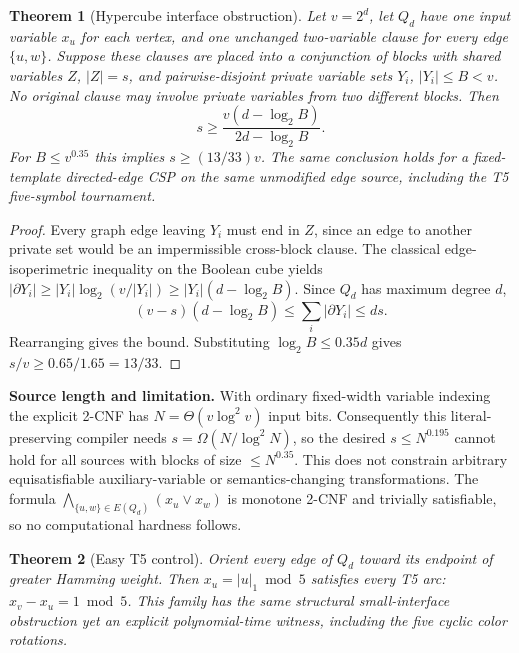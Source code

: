 \documentclass[11pt]{article}
\newtheorem{theorem}{Theorem}
\begin{document}
\begin{theorem}[Hypercube interface obstruction]
Let $v=2^d$, let $Q_d$ have one input variable $x_u$ for each vertex,
and one unchanged two-variable clause for every edge $\{u,w\}$.
Suppose these clauses are placed into a conjunction of blocks with
shared variables $Z$, $|Z|=s$, and pairwise-disjoint private variable
sets $Y_i$, $|Y_i|\le B<v$. No original clause may involve private
variables from two different blocks. Then
\[
s \ge \frac{v(d-\log_2 B)}{2d-\log_2 B}.
\]
For $B\le v^{0.35}$ this implies $s\ge (13/33)v$. The same conclusion
holds for a fixed-template directed-edge CSP on the same unmodified
edge source, including the T5 five-symbol tournament.
\end{theorem}
\begin{proof}
Every graph edge leaving $Y_i$ must end in $Z$, since an edge to
another private set would be an impermissible cross-block clause.
The classical edge-isoperimetric inequality on the Boolean cube yields
$|\partial Y_i|\ge |Y_i|\log_2(v/|Y_i|)
\ge |Y_i|(d-\log_2B)$. Since $Q_d$ has maximum degree $d$,
\[
(v-s)(d-\log_2 B)\le \sum_i|\partial Y_i|\le ds.
\]
Rearranging gives the bound. Substituting $\log_2 B\le0.35d$
gives $s/v\ge0.65/1.65=13/33$.
\end{proof}
\noindent\textbf{Source length and limitation.}
With ordinary fixed-width variable indexing the explicit 2-CNF has
$N=\Theta(v\log^2v)$ input bits. Consequently this literal-preserving
compiler needs $s=\Omega(N/\log^2N)$, so the desired $s\le N^{0.195}$
cannot hold for all sources with blocks of size $\le N^{0.35}$.
This does not constrain arbitrary equisatisfiable auxiliary-variable
or semantics-changing transformations. The formula
$\bigwedge_{\{u,w\}\in E(Q_d)}(x_u\lor x_w)$ is monotone 2-CNF and
trivially satisfiable, so no computational hardness follows.

\begin{theorem}[Easy T5 control]
Orient every edge of $Q_d$ toward its endpoint of greater Hamming
weight. Then $x_u=|u|_1\bmod5$ satisfies every T5 arc:
$x_v-x_u=1\bmod5$. This family has the same structural
small-interface obstruction yet an explicit polynomial-time witness,
including the five cyclic color rotations.
\end{theorem}
\end{document}
